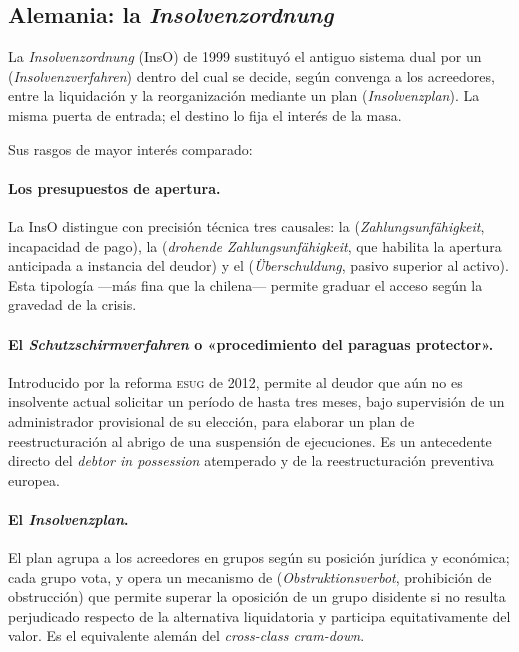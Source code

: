 \bloqueNormativo

\subsection{Alemania: la \emph{Insolvenzordnung}}

La \emph{Insolvenzordnung} (InsO) de 1999 sustituyó el antiguo sistema dual por un
 (\emph{Insolvenzverfahren}) dentro del cual se decide,
según convenga a los acreedores, entre la liquidación y la reorganización mediante un plan
(\emph{Insolvenzplan}). La misma puerta de entrada; el destino lo fija el interés de la masa.

Sus rasgos de mayor interés comparado:

\paragraph{Los presupuestos de apertura.} La InsO distingue con precisión técnica tres causales:
la  (\emph{Zahlungsunfähigkeit}, incapacidad de pago), la
 (\emph{drohende Zahlungsunfähigkeit}, que habilita la apertura
anticipada a instancia del deudor) y el  (\emph{Überschuldung}, pasivo
superior al activo). Esta tipología ---más fina que la chilena--- permite graduar el acceso según la
gravedad de la crisis.

\paragraph{El \emph{Schutzschirmverfahren} o «procedimiento del paraguas protector».} Introducido
por la reforma \textsc{esug} de 2012, permite al deudor que aún no es insolvente actual solicitar un
período de hasta tres meses, bajo supervisión de un administrador provisional de su elección, para
elaborar un plan de reestructuración al abrigo de una suspensión de ejecuciones. Es un antecedente
directo del \emph{debtor in possession} atemperado y de la reestructuración preventiva europea.

\paragraph{El \emph{Insolvenzplan}.} El plan agrupa a los acreedores en grupos según su posición
jurídica y económica; cada grupo vota, y opera un mecanismo de 
(\emph{Obstruktionsverbot}, prohibición de obstrucción) que permite superar la oposición de un grupo
disidente si no resulta perjudicado respecto de la alternativa liquidatoria y participa
equitativamente del valor. Es el equivalente alemán del \emph{cross-class cram-down}.

